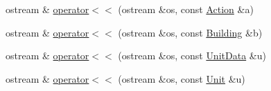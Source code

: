 \begin{DoxyCompactItemize}
\item 
ostream \& \hyperlink{namespaceghost_a8126241ce5aea5db6c61184fa000a90f}{operator$<$$<$} (ostream \&os, const \hyperlink{classghost_1_1Action}{Action} \&a)
\item 
ostream \& \hyperlink{namespaceghost_a1e7e02c276d52eda961d841a47211933}{operator$<$$<$} (ostream \&os, const \hyperlink{classghost_1_1Building}{Building} \&b)
\item 
ostream \& \hyperlink{namespaceghost_a3c71d36b7dc68d865005ad019acbae6f}{operator$<$$<$} (ostream \&os, const \hyperlink{structghost_1_1UnitData}{Unit\-Data} \&u)
\item 
ostream \& \hyperlink{namespaceghost_a9e77e4ad5af45625c1237a1679bc6ebf}{operator$<$$<$} (ostream \&os, const \hyperlink{classghost_1_1Unit}{Unit} \&u)
\end{DoxyCompactItemize}
